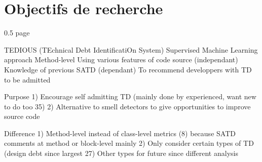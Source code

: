 %
%
%


\section{Objectifs de recherche}  

0.5 page

TEDIOUS (TEchnical Debt IdentificatiOn System)
	Supervised Machine Learning approach
	Method-level
	Using various features of code source (independant)
	Knowledge of previous SATD (dependant)
	To recommend developpers with TD to be admitted
	
Purpose
	1) Encourage self admitting TD (mainly done by experienced, want new to do too 35)
	2) Alternative to smell detectors to give opportunities to improve source code
	
Difference
	1) Method-level instead of class-level metrics (8) because SATD comments at method or block-level mainly
	2) Only consider certain types of TD (design debt since largest 27)
		Other types for future since different analysis
		

	
	

